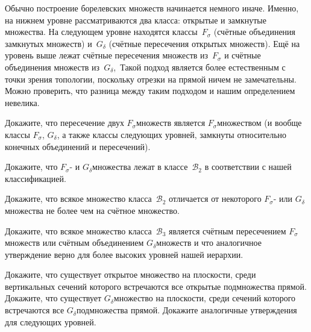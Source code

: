 Обычно построение борелевских множеств начинается немного иначе.
Именно, на нижнем уровне рассматриваются два класса: открытые и
замкнутые множества.
На следующем уровне находятся
классы~$F_\sigma$ (счётные объединения замкнутых множеств)
и~$G_{\delta}$ (счётные пересечения открытых множеств). Ещё на
уровень выше лежат счётные пересечения множеств из~$F_{\sigma}$ и счётные
объединения множеств
из~$G_{\delta}$,~ Такой подход является
более естественным
с точки зрения топологии, поскольку отрезки на прямой ничем не
замечательны. Можно проверить, что разница между таким подходом
и нашим определением невелика.

\problskip
\begin{problem}
Докажите, что пересечение двух $F_{\sigma}$\д множеств является
$F_{\sigma}$\д множеством (и вообще классы $F_{\sigma}$, $G_{\delta}$,
а также классы следующих уровней, замкнуты
относительно конечных объединений и пересечений).
\end{problem}

\begin{problem}
Докажите, что $F_{\sigma}$- и $G_{\delta}$\д множества лежат
в классе~$\mathcal{B}_2$ в соответствии с нашей классификацией.
\end{problem}

\begin{problem}
Докажите, что всякое множество класса~$\mathcal{B}_2$ отличается от
некоторого $F_{\sigma}$- или $G_{\delta}$\д множества не более
чем на счётное множество.
\end{problem}

\begin{problem}
Докажите, что всякое множество класса~$\mathcal{B}_3$ является
счётным пересечением $F_{\sigma}$\д множеств или счётным объединением
$G_{\delta}$\д множеств и что аналогичное утверждение верно
для более высоких уровней нашей иерархии.
\end{problem}

\begin{problem}
Докажите, что существует открытое множество на плоскости,
среди вертикальных сечений которого встречаются все
открытые подмножества прямой. Докажите, что существует
$G_{\delta}$\д множество на плоскости, среди сечений которого
встречаются все $G_{\delta}$\д подмножества прямой.
Докажите аналогичные утверждения для следующих уровней.
\end{problem}


